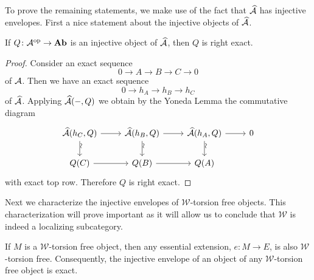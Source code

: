 \documentclass[reqno, 12pt]{amsart}
\begin{document}
To prove the remaining statements, we make use of the fact that $\widehat{\mathcal{A}}$ has injective envelopes.  First a nice statement about the injective objects of $\widehat{\mathcal{A}}$.

\begin{lemma}
  If $Q \colon \mathcal{A}^{\operatorname{op}} \to \operatorname{\bf Ab}$ is an injective object of $\widehat{\mathcal{A}}$, then $Q$ is right exact.
\end{lemma}

\begin{proof}
  Consider an exact sequence
  $$0 \to A \to B \to C \to 0$$
  of $\mathcal{A}$.
  Then we have an exact sequence
  $$0 \to h_A \to h_B \to h_C$$
  of $\widehat{\mathcal{A}}$.
  Applying $\widehat{\mathcal{A}}(-,Q)$ we obtain by the Yoneda Lemma the commutative diagram
  $$\begin{tikzcd}
    \widehat{\A}(h_C, Q) \arrow{d}[rotate=90,yshift=-.5ex,xshift=-.5ex]{\sim}\arrow{r} & \widehat{\A}(h_B, Q) \arrow{r}\arrow{d}[rotate=90,yshift=-.5ex,xshift=-.5ex]{\sim} & \widehat{\A}(h_A, Q)\arrow{d}[rotate=90,yshift=-.5ex,xshift=-.5ex]{\sim} \arrow{r} & 0\\
    Q(C) \arrow{r} & Q(B) \arrow{r} & Q(A)
  \end{tikzcd}$$
  with exact top row.
  Therefore $Q$ is right exact.
\end{proof}

Next we characterize the injective envelopes of $\mathcal{W}$-torsion free objects.
This characterization will prove important as it will allow us to conclude that $\mathcal{W}$ is indeed a localizing subcategory.

\begin{lemma}
  If $M$ is a $\mathcal{W}$-torsion free object, then any essential extension, $e \colon M \to E$, is also $\mathcal{W}$-torsion free.
  Consequently, the injective envelope of an object of any $\mathcal{W}$-torsion free object is exact.
\end{lemma}
\end{document}
